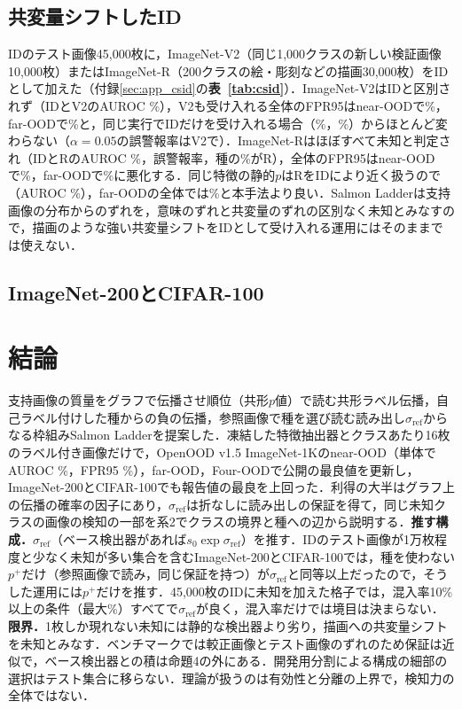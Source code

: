 \documentclass[MIRU,submit]{miru2025j}
\renewcommand\tabref[1]{\textbf{表~\ref{tab:#1}}}   %
\newcommand\AUC{AUROC}
\newcommand\FPR{FPR95}
\newcommand\pP{p^{+}}
\newcommand\sR{\sigma_{\mathrm{ref}}}
\begin{document}
\subsection{共変量シフトしたID}
\label{sec:csid}
IDのテスト画像45,000枚に，ImageNet-V2（同じ1,000クラスの新しい検証画像10,000枚）またはImageNet-R（200クラスの絵・彫刻などの描画30,000枚）をIDとして加えた（付録\ref{sec:app_csid}の\tabref{csid}）．ImageNet-V2はIDと区別されず（IDとV2の\AUC{} \NRCsVTwoNearRefIcAuroc\%），V2も受け入れる全体の\FPR{}はnear-OODで\NRCsVTwoNearRefFsFpr\%，far-OODで\NRCsVTwoFarRefFsFpr\%と，同じ実行でIDだけを受け入れる場合（\NRCsVTwoNearRefIoFpr\%，\NRCsVTwoFarRefIoFpr\%）からほとんど変わらない（$\alpha{=}0.05$の誤警報率はV2で\NRCsVTwoNearFprCsFive{}）．ImageNet-Rはほぼすべて未知と判定され（IDとRの\AUC{} \NRCsRNearRefIcAuroc\%，誤警報率\NRCsRNearFprCsFive{}，種の\NRCsRNearSeedShare\%がR），全体の\FPR{}はnear-OODで\NRCsRNearRefFsFpr\%，far-OODで\NRCsRFarRefFsFpr\%に悪化する．同じ特徴の静的$p$はRをIDにより近く扱うので（\AUC{} \NRCsRNearStaticIcAuroc\%），far-OODの全体では\NRCsRFarStaticFsFpr\%と本手法より良い．Salmon Ladderは支持画像の分布からのずれを，意味のずれと共変量のずれの区別なく未知とみなすので，描画のような強い共変量シフトをIDとして受け入れる運用にはそのままでは使えない．

\subsection{ImageNet-200とCIFAR-100}
\label{sec:in200}


\section{結論}
支持画像の質量をグラフで伝播させ順位（共形$p$値）で読む共形ラベル伝播，自己ラベル付けした種からの負の伝播，参照画像で種を選び読む読み出し$\sR$からなる枠組みSalmon Ladderを提案した．凍結した特徴抽出器とクラスあたり16枚のラベル付き画像だけで，OpenOOD v1.5 ImageNet-1Kのnear-OOD（単体で\AUC{} \NRAloneNearAuroc\%，\FPR{} \NRAloneNearFpr\%），far-OOD，Four-OODで公開の最良値を更新し，ImageNet-200とCIFAR-100でも報告値の最良を上回った．利得の大半はグラフ上の伝播の確率の因子にあり，$\sR$は折なしに読み出しの保証を得て，同じ未知クラスの画像の検知の一部を系2でクラスの境界と種への辺から説明する．\textbf{推す構成．}$\sR$（ベース検出器があれば$s_0\exp\sR$）を推す．IDのテスト画像が1万枚程度と少なく未知が多い集合を含むImageNet-200とCIFAR-100では，種を使わない$\pP$だけ（参照画像で読み，同じ保証を持つ）が$\sR$と同等以上だったので，そうした運用には$\pP$だけを推す．45,000枚のIDに未知を加えた格子では，混入率10\%以上の\NRRecHiMixN{}条件（最大\NRRecHiMixMax\%）すべてで$\sR$が良く，混入率だけでは境目は決まらない．\textbf{限界．}1枚しか現れない未知には静的な検出器より劣り，描画への共変量シフトを未知とみなす．ベンチマークでは較正画像とテスト画像のずれのため保証は近似で，ベース検出器との積は命題4の外にある．開発用分割による構成の細部の選択はテスト集合に移らない．理論が扱うのは有効性と分離の上界で，検知力の全体ではない．
\end{document}
